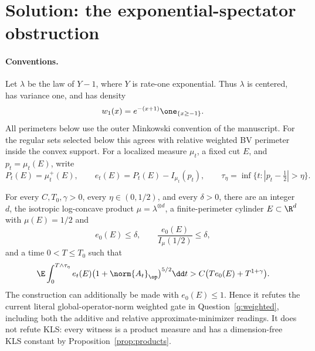 \documentclass[../main.tex]{subfiles}
\begin{document}
%
\section*{Solution: the exponential-spectator obstruction}
\label{sec:sol-weighted-spectator-obstruction}

\paragraph{Conventions.}
Let $\lambda$ be the law of $Y-1$, where $Y$ is rate-one exponential.  Thus $\lambda$ is
centered, has variance one, and has density
\[
  w_1(x)=e^{-(x+1)}\one_{\{x\ge-1\}}.
\]
All perimeters below use the outer Minkowski convention of the manuscript.  For the regular
sets selected below this agrees with relative weighted BV perimeter inside the convex support.
For a localized measure $\mu_t$, a fixed cut $E$, and
$p_t=\mu_t(E)$, write
\[
  P_t(E)=\mu_t^+(E),\qquad
  e_t(E)=P_t(E)-I_{\mu_t}(p_t),\qquad
  \tau_\eta=\inf\{t:|p_t-\tfrac12|>\eta\}.
\]

\begin{theorem}
\label{thm:sol-weighted-spectator-obstruction}
For every $C,T_0,\gamma>0$, every $\eta\in(0,1/2)$, and every $\delta>0$, there are an
integer $d$, the isotropic log-concave product $\mu=\lambda^{\otimes d}$, a finite-perimeter
cylinder $E\subset\R^d$ with $\mu(E)=1/2$ and
\[
  e_0(E)\le\delta,
  \qquad
  \frac{e_0(E)}{I_\mu(1/2)}\le\delta,
\]
and a time $0<T\le T_0$ such that
\begin{equation}
  \E\int_0^{T\wedge\tau_\eta}
  e_t(E)\bigl(1+\norm{A_t}_\op\bigr)^{5/2}\dd t
  >C\bigl(Te_0(E)+T^{1+\gamma}\bigr).
  \label{eq:sol-spectator-violation}
\end{equation}
The construction can additionally be made with $e_0(E)\le1$.  Hence it refutes the current
literal global-operator-norm weighted gate in Question~\ref{q:weighted}, including both the
additive and relative approximate-minimizer readings.  It does not refute KLS: every witness is
a product measure and has a dimension-free KLS constant by Proposition~\ref{prop:products}.
\end{theorem}
\end{document}
